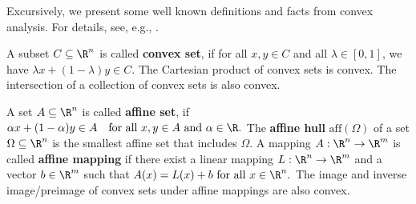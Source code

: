 Excursively, we present some well known definitions and facts from
convex analysis. For details, see, e.g., \cite{Mordukhovich2022}.

A subset $C\subseteq \R^n$ is called \textbf{convex set}, 
if for all $x,y\in C$ and all $\lambda\in [0,1]$,
we have 
$
  \lambda x + (1-\lambda)y 
  \in
  C
  .
$
The Cartesian product of convex sets is convex. The intersection of a collection of convex sets is also convex.




%
%
  A set 
  $A\subseteq \R^n$
  is called \textbf{affine set}, if
  $
    \alpha x + (1-\alpha)y \in A
    \quad
    \text{for all}
    \ 
    x,y \in A
    \ 
    \text{and}
    \ 
    \alpha \in \R.
  $
  The \textbf{affine hull} 
  $\mathrm{aff}(\Omega)$
  of a set 
  $\Omega\subseteq \R^n$
  is the smallest affine set that includes $\Omega.$
A mapping 
$
  A: \R^n \to \R^m
$
is called \textbf{affine mapping} if there exist a linear mapping
$
  L: \R^n \to \R^m
$
and a vector $b\in \R^m$
such that
$
  A(x)
  =
  L(x)
  +
  b
  \ 
  \text{for all}\ 
  x \in \R^n
  .
$
The image and inverse image/preimage of convex sets under affine mappings are also convex.

